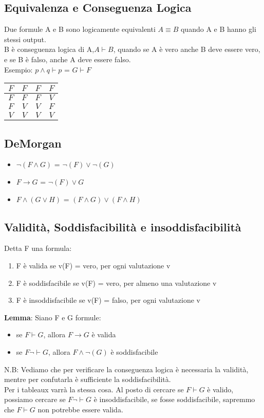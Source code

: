 \documentclass[11pt]{article}
\begin{document}
\subsection{Equivalenza e Conseguenza Logica}
Due formule A e B sono logicamente equivalenti $A \equiv B$ quando A e B hanno gli stessi output.\\
B è conseguenza logica di A,$A \vdash B$, quando se A è vero anche B deve essere vero, e se B è falso, anche A deve essere falso.\\
Esempio: $p \land q \vdash p$ = $G \vdash F$\\
\begin{tabular}{|c|c|c|c|}
    \hline
    $F$ & $F$ & $F$ & $F$\\
    \hline\hline
    $F$ & $F$ & $F$ & $V$\\
    \hline
    $F$ & $V$ & $V$ & $F$\\
    \hline
    $V$ & $V$ & $V$ & $V$\\
    \hline
\end{tabular}
\subsection{DeMorgan}
\begin{itemize}
    \item $\neg(F \land G)$ = $\neg(F) \lor \neg(G)$
    \item $F \rightarrow G$ = $\neg(F) \lor G$
    \item $F \land (G \lor H)$ = $(F \land G) \lor (F \land H)$
\end{itemize}
\subsection{Validità, Soddisfacibilità e insoddisfacibilità}
Detta F una formula:
\begin{enumerate}
    \item F è valida se v(F) = vero, per ogni valutazione v
    \item F è soddisfacibile se v(F) = vero, per almeno una valutazione v
    \item F è insoddisfacibile se v(F) = falso, per ogni valutazione v
\end{enumerate}
\textbf{Lemma}: Siano F e G formule:
\begin{itemize}
    \item se $F \vdash G$, allora $F \rightarrow G$ è valida
    \item se $F \neg\vdash G$, allora $F \land \neg(G)$ è soddisfacibile
\end{itemize}
N.B: Vediamo che per verificare la conseguenza logica è necessaria la validità, mentre per confutarla è sufficiente la soddisfacibilità.\\
Per i tableaux varrà la stessa cosa. Al posto di cercare se $F \vdash G$ è valido, possiamo cercare se $F \neg\vdash G$ è insoddisfacibile, se fosse soddisfacibile, sapremmo che $F \vdash G$ non potrebbe essere valida.
\end{document}
